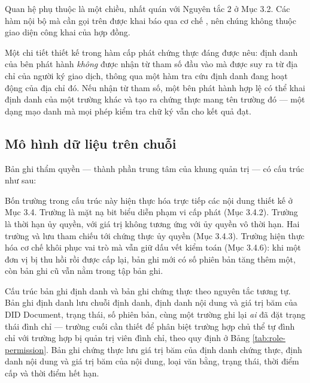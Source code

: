 Quan hệ phụ thuộc là một chiều, nhất quán với Nguyên tắc 2 ở Mục 3.2. Các hàm nội bộ mà  cần gọi trên  được khai báo qua cơ chế , nên chúng không thuộc giao diện công khai của hợp đồng.

Một chi tiết thiết kế trong hàm cấp phát chứng thực đáng được nêu: định danh của bên phát hành \emph{không} được nhận từ tham số đầu vào mà được suy ra từ địa chỉ của người ký giao dịch, thông qua một hàm tra cứu định danh đang hoạt động của địa chỉ đó. Nếu nhận từ tham số, một bên phát hành hợp lệ có thể khai định danh của một trường khác và tạo ra chứng thực mang tên trường đó --- một dạng mạo danh mà mọi phép kiểm tra chữ ký vẫn cho kết quả đạt.

\subsection{Mô hình dữ liệu trên chuỗi}

Bản ghi thẩm quyền --- thành phần trung tâm của khung quản trị --- có cấu trúc như sau:



Bốn trường trong cấu trúc này hiện thực hóa trực tiếp các nội dung thiết kế ở Mục 3.4. Trường  là mặt nạ bit biểu diễn phạm vi cấp phát (Mục 3.4.2). Trường  là thời hạn ủy quyền, với giá trị không tương ứng với ủy quyền vô thời hạn. Hai trường  và  lưu tham chiếu tới chứng thực ủy quyền (Mục 3.4.3). Trường  hiện thực hóa cơ chế khôi phục vai trò mà vẫn giữ dấu vết kiểm toán (Mục 3.4.6): khi một đơn vị bị thu hồi rồi được cấp lại, bản ghi mới có số phiên bản tăng thêm một, còn bản ghi cũ vẫn nằm trong tập bản ghi.

Cấu trúc bản ghi định danh và bản ghi chứng thực theo nguyên tắc tương tự. Bản ghi định danh lưu chuỗi định danh, định danh nội dung và giá trị băm của DID Document, trạng thái, số phiên bản, cùng một trường ghi lại \emph{ai} đã đặt trạng thái đình chỉ --- trường cuối cần thiết để phân biệt trường hợp chủ thể tự đình chỉ với trường hợp bị quản trị viên đình chỉ, theo quy định ở Bảng \ref{tab:role-permission}. Bản ghi chứng thực lưu giá trị băm của định danh chứng thực, định danh nội dung và giá trị băm của nội dung, loại văn bằng, trạng thái, thời điểm cấp và thời điểm hết hạn.

